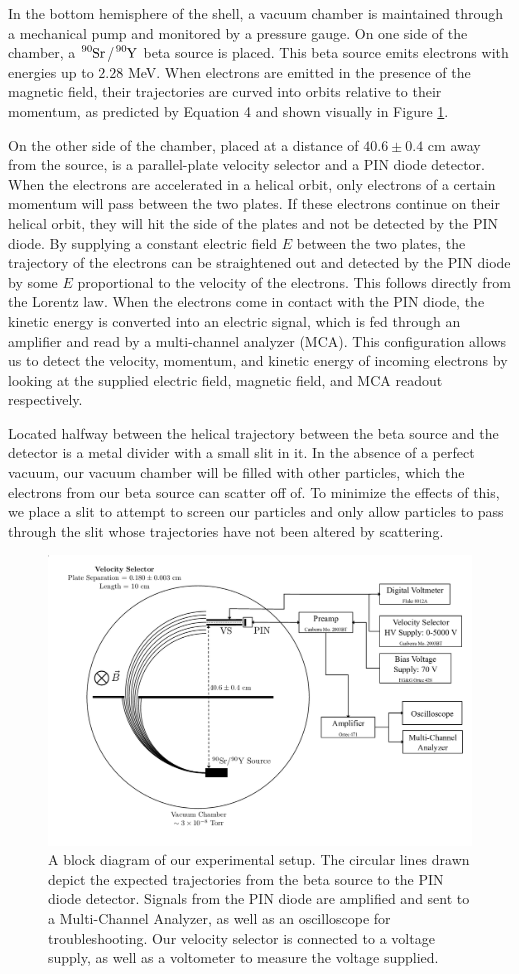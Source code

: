 In the bottom hemisphere of the shell, a vacuum chamber is maintained through a mechanical pump and monitored by a pressure gauge. On one side of the chamber, a $\tensor*[^{90}]{\text{Sr}}{}$/$\tensor*[^{90}]{\text{Y}}{}$ beta source is placed. This beta source emits electrons with energies up to $2.28$ MeV. When electrons are emitted in the presence of the magnetic field, their trajectories are curved into orbits relative to their momentum, as predicted by Equation 4 and shown visually in Figure \ref{diagram}.

On the other side of the chamber, placed at a distance of $40.6 \pm 0.4$ cm away from the source, is a parallel-plate velocity selector and a PIN diode detector. When the electrons are accelerated in a helical orbit, only electrons of a certain momentum will pass between the two plates. If these electrons continue on their helical orbit, they will hit the side of the plates and not be detected by the PIN diode. By supplying a constant electric field $E$ between the two plates, the trajectory of the electrons can be straightened out and detected by the PIN diode by some $E$ proportional to the velocity of the electrons. This follows directly from the Lorentz law. When the electrons come in contact with the PIN diode, the kinetic energy is converted into an electric signal, which is fed through an amplifier and read by a multi-channel analyzer (MCA). This configuration allows us to detect the velocity, momentum, and kinetic energy of incoming electrons by looking at the supplied electric field, magnetic field, and MCA readout respectively.

Located halfway between the helical trajectory between the beta source and the detector is a metal divider with a small slit in it. In the absence of a perfect vacuum, our vacuum chamber will be filled with other particles, which the electrons from our beta source can scatter off of. To minimize the effects of this, we place a slit to attempt to screen our particles and only allow particles to pass through the slit whose trajectories have not been altered by scattering.

\begin{figure}[h]
  \includegraphics[width=.5\textwidth]{setup.png}
  \caption{A block diagram of our experimental setup. The circular lines drawn depict the expected trajectories from the beta source to the PIN diode detector. Signals from the PIN diode are amplified and sent to a Multi-Channel Analyzer, as well as an oscilloscope for troubleshooting. Our velocity selector is connected to a voltage supply, as well as a voltometer to measure the voltage supplied.
\cite{emanual}}
  \label{diagram}
\end{figure}

